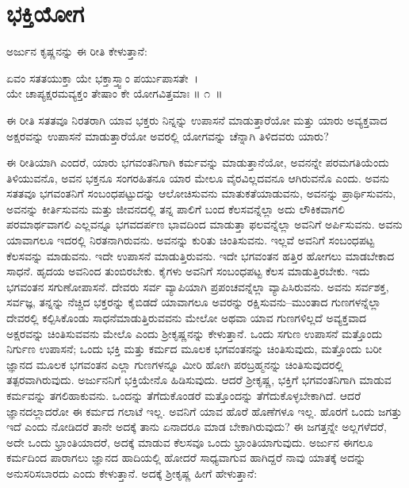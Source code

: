 
\chapter{ಭಕ್ತಿಯೋಗ}

ಅರ್ಜುನ ಕೃಷ್ಣನನ್ನು ಈ ರೀತಿ ಕೇಳುತ್ತಾನೆ:

\begin{shloka}
ಏವಂ ಸತತಯುಕ್ತಾ ಯೇ ಭಕ್ತಾಸ್ತ್ವಾಂ ಪರ್ಯುಪಾಸತೇ~।\\ಯೇ ಚಾಪ್ಯಕ್ಷರಮವ್ಯಕ್ತಂ ತೇಷಾಂ ಕೇ ಯೋಗವಿತ್ತಮಾಃ \hfill॥ ೧~॥
\end{shloka}

\begin{artha}
ಈ ರೀತಿ ಸತತವೂ ನಿರತರಾಗಿ ಯಾವ ಭಕ್ತರು ನಿನ್ನನ್ನು ಉಪಾಸನೆ ಮಾಡುತ್ತಾರೆಯೋ ಮತ್ತು ಯಾರು ಅವ್ಯಕ್ತವಾದ ಅಕ್ಷರವನ್ನು ಉಪಾಸನೆ ಮಾಡುತ್ತಾರೆಯೋ ಅವರಲ್ಲಿ ಯೋಗವನ್ನು ಚೆನ್ನಾಗಿ ತಿಳಿದವರು ಯಾರು?
\end{artha}

ಈ ರೀತಿಯಾಗಿ ಎಂದರೆ, ಯಾರು ಭಗವಂತನಿಗಾಗಿ ಕರ್ಮವನ್ನು ಮಾಡುತ್ತಾನೆಯೋ, ಅವನನ್ನೇ ಪರಮಗತಿಯೆಂದು ತಿಳಿಯುವನೊ, ಅವನ ಭಕ್ತನೂ ಸಂಗರಹಿತನೂ ಯಾರ ಮೇಲೂ ವೈರವಿಲ್ಲದವನೂ ಆಗಿರುವನೊ ಎಂದು. ಅವನು ಸತತವೂ ಭಗವಂತನಿಗೆ ಸಂಬಂಧಪಟ್ಟುದನ್ನು ಆಲೋಚಿಸುವನು ಮಾತುಕತೆಯಾಡುವನು, ಅವನನ್ನು ಪ್ರಾರ್ಥಿಸುವನು, ಅವನನ್ನು ಕೀರ್ತಿಸು\-ವನು ಮತ್ತು ಜೀವನದಲ್ಲಿ ತನ್ನ ಪಾಲಿಗೆ ಬಂದ ಕೆಲಸವನ್ನೆಲ್ಲಾ ಅದು ಲೌಕಿಕವಾಗಲಿ ಪರಮಾರ್ಥ\-ವಾಗಲಿ ಎಲ್ಲವನ್ನೂ ಭಗವದರ್ಪಣ ಭಾವದಿಂದ ಮಾಡುತ್ತಾ ಫಲವನ್ನೆಲ್ಲಾ ಅವನಿಗೆ ಅರ್ಪಿಸುವನು. ಅವನು ಯಾವಾಗಲೂ ಇದರಲ್ಲಿ ನಿರತನಾಗಿರುವನು. ಅವನನ್ನು ಕುರಿತು ಚಿಂತಿಸುವನು. ಇಲ್ಲವೆ ಅವನಿಗೆ ಸಂಬಂಧಪಟ್ಟ ಕೆಲಸವನ್ನು ಮಾಡುವನು. ಇದೇ ಉಪಾಸನೆ ಮಾಡುತ್ತಿರುವನು. ಇದೇ ಭಗವಂತನ ಹತ್ತಿರ ಹೋಗಲು ಮಾಡಬೇಕಾದ ಸಾಧನೆ. ಹೃದಯ ಅವನಿಂದ ತುಂಬಿರಬೇಕು. ಕೈಗಳು ಅವನಿಗೆ ಸಂಬಂಧಪಟ್ಟ ಕೆಲಸ ಮಾಡುತ್ತಿರಬೇಕು. ಇದು ಭಗವಂತನ ಸಗುಣೋಪಾಸನೆ. ದೇವರು ಸರ್ವ ವ್ಯಾಪಿಯಾಗಿ ಪ್ರಪಂಚವನ್ನೆಲ್ಲಾ ವ್ಯಾಪಿಸಿರುವನು. ಅವನು ಸರ್ವಶಕ್ತ, ಸರ್ವಜ್ಞ, ತನ್ನನ್ನು ನೆಚ್ಚಿದ ಭಕ್ತರನ್ನು ಕೈಬಿಡದೆ ಯಾವಾಗಲೂ ಅವರನ್ನು ರಕ್ಷಿಸುವನು–ಮುಂತಾದ ಗುಣಗಳನ್ನೆಲ್ಲಾ ದೇವರಲ್ಲಿ ಕಲ್ಪಿಸಿಕೊಂಡು ಸಾಧನೆಮಾಡುತ್ತಿರುವವನು ಮೇಲೋ ಅಥವಾ ಯಾವ ಗುಣಗಳಿಲ್ಲದೆ ಅವ್ಯಕ್ತವಾದ ಅಕ್ಷರವನ್ನು ಚಿಂತಿಸುವವನು ಮೇಲೊ ಎಂದು ಶ‍್ರೀಕೃಷ್ಣನನ್ನು ಕೇಳುತ್ತಾನೆ. ಒಂದು ಸಗುಣ ಉಪಾಸನೆ ಮತ್ತೊಂದು ನಿರ್ಗುಣ ಉಪಾಸನೆ; ಒಂದು ಭಕ್ತಿ ಮತ್ತು ಕರ್ಮದ ಮೂಲಕ ಭಗವಂತನನ್ನು ಚಿಂತಿಸುವುದು, ಮತ್ತೊಂದು ಬರೀ ಜ್ಞಾನದ ಮೂಲಕ ಭಗವಂತನ ಎಲ್ಲಾ ಗುಣಗಳನ್ನೂ ಮೀರಿ ಹೋಗಿ ಪರಬ್ರಹ್ಮನನ್ನು ಚಿಂತಿಸುವುದರಲ್ಲಿ ತತ್ಪರವಾಗಿರುವುದು. ಅರ್ಜುನನಿಗೆ ಭಕ್ತಿಯೇನೊ ಹಿಡಿಸುವುದು. ಆದರೆ ಶ‍್ರೀಕೃಷ್ಣ, ಭಕ್ತಿಗೆ ಭಗವಂತನಿಗಾಗಿ ಮಾಡುವ ಕರ್ಮವನ್ನು ತಗಲಿಹಾಕುವನು. ಒಂದನ್ನು ತೆಗೆದುಕೊಂಡರೆ ಮತ್ತೊಂದನ್ನು ತೆಗೆದುಕೊಳ್ಳಬೇಕಾಗಿದೆ. ಆದರೆ ಜ್ಞಾನದಲ್ಲಾದರೋ ಈ ಕರ್ಮದ ಗಲಾಟೆ ಇಲ್ಲ. ಅವನಿಗೆ ಯಾವ ಹೊರೆ ಹೊಣೆಗಳೂ ಇಲ್ಲ. ಹೊರಗೆ ಒಂದು ಜಗತ್ತು ಇದೆ ಎಂದು ನೋಡಿದರೆ ತಾನೇ ಅದಕ್ಕೆ ತಾನು ಏನಾದರೂ ಮಾಡ ಬೇಕಾಗಿರುವುದು? ಈ ಜಗತ್ತನ್ನೇ ಅಲ್ಲಗಳೆದರೆ, ಅದೇ ಒಂದು ಭ್ರಾಂತಿಯಾದರೆ, ಅದಕ್ಕೆ ಮಾಡುವ ಕೆಲಸವೂ ಒಂದು ಭ್ರಾಂತಿಯಾಗುವುದು. ಅರ್ಜುನ ಈಗಲೂ ಕರ್ಮದಿಂದ ಪಾರಾಗಲು ಜ್ಞಾನದ ಹಾದಿಯಲ್ಲಿ ಹೋದರೆ ಸಾಧ್ಯವಾಗುವ ಹಾಗಿದ್ದರೆ ನಾವು ಯಾತಕ್ಕೆ ಅದನ್ನು ಅನುಸರಿಸಬಾರದು ಎಂದು ಕೇಳುತ್ತಾನೆ. ಅದಕ್ಕೆ ಶ‍್ರೀಕೃಷ್ಣ ಹೀಗೆ ಹೇಳುತ್ತಾನೆ:

